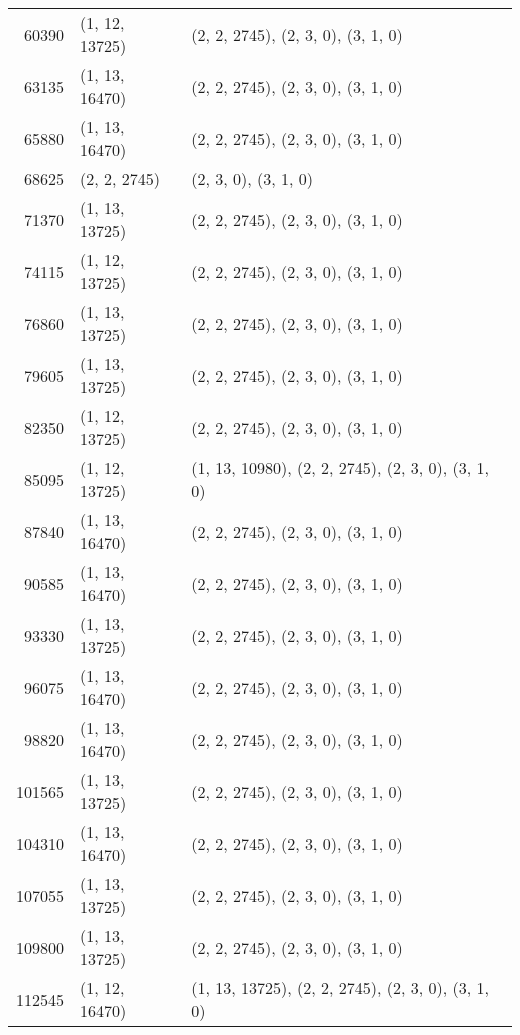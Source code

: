 \begin{table}
\begin{tabularx}{6.5 in}{r l X}
60390 & (1, 12, 13725) & (2, 2, 2745), (2, 3, 0), (3, 1, 0) \\
63135 & (1, 13, 16470) & (2, 2, 2745), (2, 3, 0), (3, 1, 0) \\
65880 & (1, 13, 16470) & (2, 2, 2745), (2, 3, 0), (3, 1, 0) \\
68625 & (2, 2, 2745) & (2, 3, 0), (3, 1, 0) \\
71370 & (1, 13, 13725) & (2, 2, 2745), (2, 3, 0), (3, 1, 0) \\
74115 & (1, 12, 13725) & (2, 2, 2745), (2, 3, 0), (3, 1, 0) \\
76860 & (1, 13, 13725) & (2, 2, 2745), (2, 3, 0), (3, 1, 0) \\
79605 & (1, 13, 13725) & (2, 2, 2745), (2, 3, 0), (3, 1, 0) \\
82350 & (1, 12, 13725) & (2, 2, 2745), (2, 3, 0), (3, 1, 0) \\
85095 & (1, 12, 13725) & (1, 13, 10980), (2, 2, 2745), (2, 3, 0), (3, 1, 0) \\
87840 & (1, 13, 16470) & (2, 2, 2745), (2, 3, 0), (3, 1, 0) \\
90585 & (1, 13, 16470) & (2, 2, 2745), (2, 3, 0), (3, 1, 0) \\
93330 & (1, 13, 13725) & (2, 2, 2745), (2, 3, 0), (3, 1, 0) \\
96075 & (1, 13, 16470) & (2, 2, 2745), (2, 3, 0), (3, 1, 0) \\
98820 & (1, 13, 16470) & (2, 2, 2745), (2, 3, 0), (3, 1, 0) \\
101565 & (1, 13, 13725) & (2, 2, 2745), (2, 3, 0), (3, 1, 0) \\
104310 & (1, 13, 16470) & (2, 2, 2745), (2, 3, 0), (3, 1, 0) \\
107055 & (1, 13, 13725) & (2, 2, 2745), (2, 3, 0), (3, 1, 0) \\
109800 & (1, 13, 13725) & (2, 2, 2745), (2, 3, 0), (3, 1, 0) \\
112545 & (1, 12, 16470) & (1, 13, 13725), (2, 2, 2745), (2, 3, 0), (3, 1, 0) \\
\hline
\end{tabularx}
\end{table}

